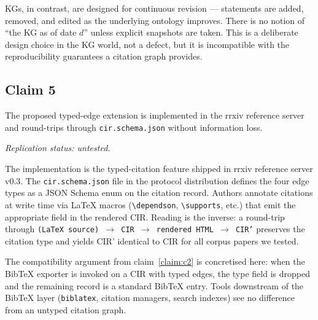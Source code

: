 \documentclass{rrxiv}
\begin{document}
KGs, in contrast, are designed for continuous revision --- statements are added, removed, and edited as the underlying ontology improves. There is no notion of ``the KG as of date $d$'' unless explicit snapshots are taken. This is a deliberate design choice in the KG world, not a defect, but it is incompatible with the reproducibility guarantees a citation graph provides.

\subsection*{Claim 5}
\begin{claim}[type=computational, evidence=experiment, confidence=0.85, rationale={Round-trip CIR identity verified for the rrxiv corpus only; not exercised at arXiv scale}, labels={citation-graphs, knowledge-graphs, position, implementation}, title={Reference implementation}]
\label{claim:c5}
The proposed typed-edge extension is implemented in the rrxiv reference server and round-trips through \texttt{cir.schema.json} without information loss.

\emph{Replication status: untested.}
\end{claim}


The implementation is the typed-citation feature shipped in rrxiv reference server v0.3. The \texttt{cir.schema.json} file in the protocol distribution defines the four edge types as a JSON Schema enum on the citation record. Authors annotate citations at write time via \LaTeX{} macros (\texttt{\textbackslash dependson}, \texttt{\textbackslash supports}, etc.) that emit the appropriate field in the rendered CIR. Reading is the inverse: a round-trip through \texttt{(LaTeX source) $\to$ CIR $\to$ rendered HTML $\to$ CIR'} preserves the citation type and yields CIR' identical to CIR for all corpus papers we tested.

The compatibility argument from claim~\ref{claim:c2} is concretised here: when the BibTeX exporter is invoked on a CIR with typed edges, the type field is dropped and the remaining record is a standard BibTeX entry. Tools downstream of the BibTeX layer (\texttt{biblatex}, citation managers, search indexes) see no difference from an untyped citation graph.
\end{document}
